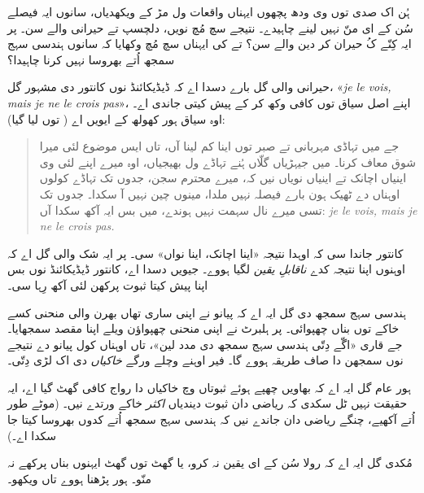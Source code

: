 \documentclass[../../../include/open-logic-section]{subfiles}
\begin{document}


ہُن اک صدی توں وی ودھ پچھوں ایہناں واقعات ول مڑ کے ویکھدیاں، سانوں ایہ فیصلے سُن کے ای منّ نہیں لینے چاہیدے۔ نتیجے سچ مُچ نویں، دلچسپ تے حیرانی والے سن۔ پر ایہ کِنّے کُ حیران کر دین والے سن؟ تے کی ایہناں سچ مُچ وکھایا کہ سانوں ہندسی سہج سمجھ اُتے بھروسا نہیں کرنا چاہیدا؟

حیرانی والی گل بارے \citet{Gouvea2011} دسدا اے کہ ڈیڈیکائنڈ نوں کانتور دی مشہور گل، «\emph{je le vois, mais je ne le crois
pas}»، اپنے اصل سیاق توں کافی وکھ کر کے پیش کیتی جاندی اے۔ اوہ سیاق ہور کھولھ کے ایویں اے (\citeauthor{Gouvea2011} توں لیا گیا):
\begin{quote}
جے میں تہاڈی مہربانی تے صبر توں اینا کم لینا آں، تاں ایس موضوع لئی میرا شوق معاف کرنا۔ میں جیہڑیاں گلّاں ہُنے تہاڈے ول بھیجیاں، اوہ میرے اپنے لئی وی اینیاں اچانک تے اینیاں نویاں نیں کہ، میرے محترم سجن، جدوں تک تہاڈے کولوں اوہناں دے ٹھیک ہون بارے فیصلہ نہیں ملدا، مینوں چین نہیں آ سکدا۔ جدوں تک تسی میرے نال سہمت نہیں ہوندے، میں بس ایہ آکھ سکدا آں:
\emph{je le vois, mais je ne le crois pas.}
\end{quote}
کانتور جاندا سی کہ اوہدا نتیجہ «اینا اچانک، اینا نواں» سی۔ پر ایہ شک والی گل اے کہ اوہنوں اپنا نتیجہ کدے \emph{ناقابلِ یقین} لگیا ہووے۔ جیویں \citeauthor{Gouvea2011} دسدا اے، کانتور ڈیڈیکائنڈ نوں بس اپنا پیش کیتا ثبوت پرکھن لئی آکھ رِہا سی۔

ہندسی سہج سمجھ دی گل ایہ اے کہ پیانو نے اپنی ساری تھاں بھرن والی منحنی کسے خاکے توں بناں چھپوائی۔ پر ہلبرٹ نے اپنی منحنی چھپواؤن ویلے اپنا مقصد سمجھایا۔ جے قاری «اگّے دِتّی ہندسی سہج سمجھ دی مدد لین»، تاں اوہناں کول پیانو دے نتیجے نوں سمجھن دا صاف طریقہ ہووے گا۔ فیر اوہنے  وچلے ورگے \emph{خاکیاں} دی اک لڑی دِتّی۔

ہور عام گل ایہ اے کہ بھاویں چھپے ہوئے ثبوتاں وچ خاکیاں دا رواج کافی گھٹ گیا اے، ایہ حقیقت نہیں ٹل سکدی کہ ریاضی دان ثبوت دیندیاں \emph{اکثر} خاکے ورتدے نیں۔ (موٹے طور اُتے آکھیے، چنگے ریاضی دان جاندے نیں کہ ہندسی سہج سمجھ اُتے کدوں بھروسا کیتا جا سکدا اے۔)

مُکدی گل ایہ اے کہ رولا سُن کے ای یقین نہ کرو، یا گھٹ توں گھٹ ایہنوں بناں پرکھے نہ منّو۔ ہور پڑھنا ہووے تاں \citet{Giaquinto2007} ویکھو۔
\end{document}
